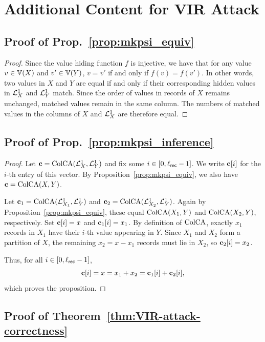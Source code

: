 \section{Additional Content for VIR Attack}\label{ap:VIR}

\subsection{Proof of Prop.~\ref{prop:mkpsi_equiv}}\label{proof:mkpsi_equiv}

\begin{proof}
	Since the value hiding function $f$ is injective, 
	we have that for any value $v \in \Ispace[X]$ and $v' \in \Ispace[Y]$,
	$v = v'$ if and only if $f(v) = f(v')$.
	In other words, two values in $X$ and $Y$ are equal if and only if their corresponding hidden values in ${\mathcal{L}^1_{X_{}}}$ and ${\mathcal{L}^1_{Y}}$ match.
	Since the order of values in records of $X$ remains unchanged, 
	matched values remain in the same column. 
	The numbers of matched values in the columns of $X$ and ${\mathcal{L}^1_{X_{}}}$ are therefore equal.
\end{proof}


\subsection{Proof of Prop.~\ref{prop:mkpsi_inference}}\label{proof:mkpsi_inference}


\begin{proof}
	Let $\mathbf{c} = \text{ColCA}({\mathcal{L}^1_{X_{}}}, {\mathcal{L}^1_{Y}})$ and fix some $i \in [0,\ell_{\mathsf{rec}}-1]$. We write $\mathbf{c}[i]$ for the $i$-th entry of this vector. By Proposition~\ref{prop:mkpsi_equiv}, we also have $\mathbf{c} = \text{ColCA}(X, Y)$.

	Let $\mathbf{c}_1 = \text{ColCA}({\mathcal{L}^1_{X_{1}}}, {\mathcal{L}^1_{Y}})$ and $\mathbf{c}_2 = \text{ColCA}({\mathcal{L}^1_{X_{2}}}, {\mathcal{L}^1_{Y}})$. Again by Proposition~\ref{prop:mkpsi_equiv}, these equal $\text{ColCA}(X_1, Y)$ and $\text{ColCA}(X_2, Y)$, respectively. Set $\mathbf{c}[i] = x$ and $\mathbf{c}_1[i] = x_1$. By definition of $\text{ColCA}$, exactly $x_1$ records in $X_1$ have their $i$-th value appearing in $Y$. Since $X_1$ and $X_2$ form a partition of $X$, the remaining $x_2 = x - x_1$ records must lie in $X_2$, so $\mathbf{c}_2[i] = x_2$.

	Thus, for all $i \in [0,\ell_{\mathsf{rec}}-1]$,
	\[
		\mathbf{c}[i] = x = x_1 + x_2 = \mathbf{c}_1[i] + \mathbf{c}_2[i],
	\]
	which proves the proposition.
\end{proof}



\subsection{Proof of Theorem~\ref{thm:VIR-attack-correctness}}\label{proof:VIR-attack-correctness}

